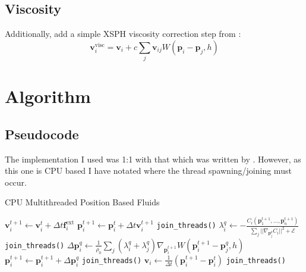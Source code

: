 \documentclass[sigplan,screen]{acmart}
\begin{document}
\subsection{Viscosity}
Additionally, \cite{Muller} add a simple XSPH viscosity correction step from \cite{Schechter}:
\begin{equation}
  \mathbf{v}_i^{\text{visc}} = \mathbf{v}_i + c \sum_j \mathbf{v}_{ij} W(\mathbf{p}_i - \mathbf{p}_j, h)
\end{equation}

\section{Algorithm}
\subsection{Pseudocode}
The implementation I used was 1:1 with that which was written by \cite{Muller}. However, as this one is CPU based I have notated where the thread spawning/joining must occur.
\begin{algorithm}
\caption{CPU Multithreaded Position Based Fluids}
\label{alg:cpu}
\begin{algorithmic}[1]
   
    \State $\mathbf{v}_i^{t+1} \gets \mathbf{v}_i^t + \Delta t \mathbf{f}_i^{\text{ext}}$
    \State $\mathbf{p}_i^{t+1} \gets \mathbf{p}_i^t + \Delta t \mathbf{v}_i^{t+1}$
  \EndFor
  \State \texttt{join\_threads()} 
   
      \State $\lambda^q_i \gets - \frac{C_i(\mathbf{p}^{t+1}_1, ...,\mathbf{p}^{t+1}_n)}{\sum_j ||\nabla_{\mathbf{p}^q_j} C_i||^2 + \mathcal{E}}$
    \EndFor
    \State \texttt{join\_threads()}
      \State $\Delta \mathbf{p}^q_i \gets \frac{1}{\rho_0} \sum_j (\lambda^q_i + \lambda^q_j) \nabla_{\mathbf{p}^{t+1}_i}W(\mathbf{p}^{t+1}_i - \mathbf{p}^q_j, h)$
      \State $\mathbf{p}_i^{t+1} \gets \mathbf{p}_i^{t+1} + \Delta \mathbf{p}^q_i$
    \EndFor
    \State \texttt{join\_threads()}
  \EndFor
    \State $\mathbf{v}_i \gets \frac{1}{\Delta t} \left( \mathbf{p}^{t+1}_i - \mathbf{p}^t_i\right)$
  \EndFor
  \State \texttt{join\_threads()}
   
   
\end{algorithmic}
\end{algorithm}
\end{document}
